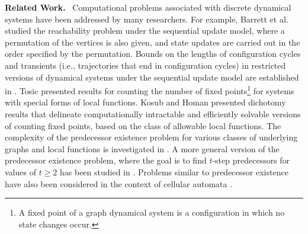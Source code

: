 \noindent
\textbf{Related Work.}~ %
Computational problems associated with 
discrete dynamical systems 
have been addressed by many researchers.
For example, Barrett et al. \cite{BH+06} studied the
reachability problem under the sequential
update model, where a permutation of the vertices is also given,
and state updates are carried out in the order specified by the
permutation.  
Bounds on the lengths of configuration cycles and transients 
(i.e., trajectories that end in configuration cycles) in restricted versions
of dynamical systems under the sequential update model are established
in \cite{MR-2007}.  
Tosic \cite{Tos-2010,Tosic-2017} presented results for counting
the number of fixed points\footnote{A fixed point of a graph dynamical
system is a configuration in which no state changes occur.}
for systems with special forms of local functions.
Kosub and Homan \cite{KH-2007} presented dichotomy
results that delineate computationally intractable and efficiently
solvable versions of counting fixed points, based on the class of
allowable local functions.  
The complexity of the predecessor existence problem 
for various classes of underlying graphs and local functions is 
investigated in \cite{BH+07}.
A more general version of the predecessor existence problem,
where the goal is to find $t$-step predecessors for values of $t \geq 2$
has been studied in \cite{Kawachi-et-al-2017,MR+2018}.
Problems similar to predecessor existence have
also been considered in the context of cellular automata
\cite{Gre-1987,Dur-1994}.
